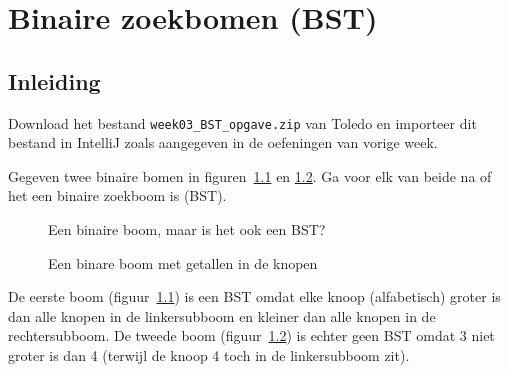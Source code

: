 \chapter{Binaire zoekbomen (BST)}


\section*{Inleiding}

Download het bestand \verb=week03_BST_opgave.zip= van Toledo en importeer dit bestand in IntelliJ zoals aangegeven in de oefeningen van vorige week. 

\begin{oef}
\papier Gegeven twee binaire bomen in figuren~\ref{fig:BSToef1} en \ref{fig:oefBST2}. Ga voor elk van beide na of het een binaire zoekboom is (BST).
\begin{figure}[htbp]
    \centering
{}
\caption{Een binaire boom, maar is het ook een BST?}
    \label{fig:BSToef1}
\end{figure}

\begin{figure}[htbp]
    \centering
{}
\caption{Een binare boom met getallen in de knopen}
    \label{fig:oefBST2}
\end{figure}

\begin{opl}
De eerste boom (figuur~\ref{fig:BSToef1}) is een BST omdat elke knoop (alfabetisch) groter is dan alle knopen in de linkersubboom en kleiner dan alle knopen in de rechtersubboom. De tweede boom (figuur~\ref{fig:oefBST2}) is echter geen BST omdat 3 niet groter is dan 4 (terwijl de knoop 4 toch in de linkersubboom zit).
\end{opl}
\end{oef}




